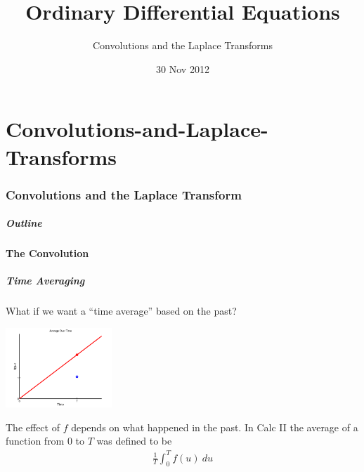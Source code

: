 \part{Convolutions-and-Laplace-Transforms}
\section{Convolutions and the Laplace Transform}

\title{Ordinary Differential Equations}
\subtitle{Convolutions and the Laplace Transforms}
\date{30 Nov 2012}

\begin{frame}
  \titlepage
\end{frame}

\begin{frame}
  \frametitle{Outline}
  \tableofcontents[currentsection]
\end{frame}


\subsection{The Convolution}


\begin{frame}
  \frametitle{Time Averaging}

  What if we want a ``time average'' based on the past? 

  \centerline{\includegraphics[width=4cm]{img/linearAverage}}

  {%

    The effect of $f$ depends on what happened in the past. 
    In Calc II the average of a function from $0$ to $T$ was defined to be 
    \begin{eqnarray*}
      \frac{1}{T} \int^T_0 f(u) ~ du
    \end{eqnarray*}

  }


\end{frame}

